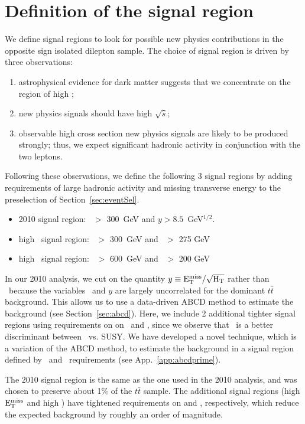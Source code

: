 \section{Definition of the signal region}
\label{sec:sigregion}

We define signal regions to look for possible
new physics contributions in the opposite sign isolated 
dilepton sample. The choice of signal region is driven by 
three observations:
\begin{enumerate}
\item astrophysical evidence for dark matter suggests that
we concentrate on the region of high \met;
\item new physics signals should have high $\sqrt{\hat{s}}$;
\item observable high cross section new physics signals 
are likely to be produced strongly;  thus, we expect significant
hadronic activity in conjunction with the two leptons.
\end{enumerate}

Following these observations, we define the following 3 signal regions by 
adding requirements of large hadronic activity and missing transverse energy 
to the preselection of Section~\ref{sec:eventSel}. 
\begin{itemize}
\item 2010 signal region:       \Ht\ $>$ 300~GeV and $y > 8.5$~GeV$^{1/2}$.
\item high \met\ signal region: \Ht\ $>$ 300~GeV and \met\ $>$ 275 GeV
\item high \Ht\  signal region: \Ht\ $>$ 600~GeV and \met\ $>$ 200 GeV
\end{itemize}

In our 2010 analysis, we cut on the quantity $y \equiv \rm E_{T}^{miss}/\sqrt{H_T}$ rather than \met\
because the variables \Ht\ and $y$ are
largely uncorrelated for the dominant $t\bar{t}$ background.  
This allows us to use a data-driven ABCD method to estimate the
background (see Section~\ref{sec:abcd}). Here, we include 2 additional tighter signal
regions using requirements on on \met\ and \Ht, since we observe that \met\ is a better 
discriminant between \ttbar\ vs. SUSY. We have developed a novel technique, which is a 
variation of the ABCD method, to estimate the background in a signal region defined by
\met\ and \Ht\ requirements (see App.~\ref{app:abcdprime}).

The 2010 signal region is the same as the one used in the 2010 analysis, and was
chosen to preserve about 1\% of the $t\bar{t}$ sample.
The additional signal regions (high $\rm E_{T}^{miss}$ and high \Ht) have tightened requirements
on \met and \Ht, respectively, which reduce the expected background by roughly
an order of magnitude.


